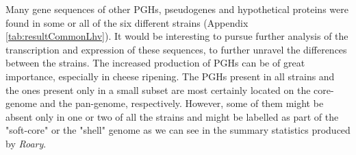 \documentclass[10pt,a4paper]{article}
\begin{document}
\noindent Many gene sequences of other PGHs, pseudogenes and hypothetical proteins were found in some or all of the six different strains (Appendix \ref{tab:resultCommonLhv}). It would be interesting to pursue further analysis of the transcription and expression of these sequences, to further unravel the differences between the strains. The increased production of PGHs can be of great importance, especially in cheese ripening. The PGHs present in all strains and the ones present only in a small subset are most certainly located on the core-genome and the pan-genome, respectively. However, some of them might be absent only in one or two of all the strains and might be labelled as part of the "soft-core" or the "shell" genome \cite{kaas_estimating_2012,inglin_clustering_2018} as we can see in the summary statistics produced by \textit{Roary}.

\newpage


\begin{multicols}{2}
	{}
	
\end{multicols}	

\appendix
\setcounter{table}{0}  
\end{document}

